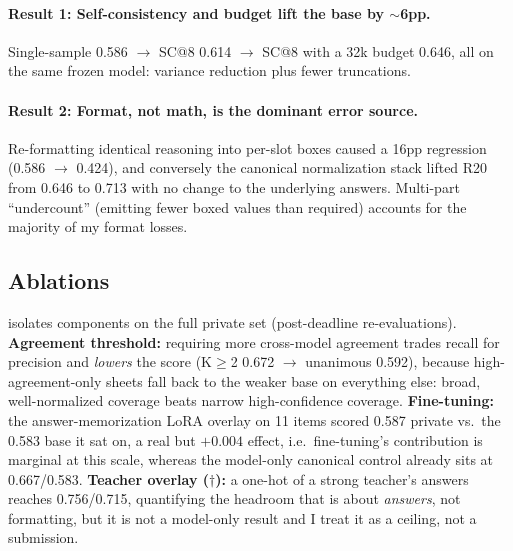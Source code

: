 \documentclass{article}
\begin{document}
\paragraph{Result 1: Self-consistency and budget lift the base by $\sim$6pp.}
Single-sample 0.586 $\to$ SC@8 0.614 $\to$ SC@8 with a 32k budget 0.646, all on the
same frozen model: variance reduction plus fewer truncations.

\paragraph{Result 2: Format, not math, is the dominant error source.}
Re-formatting identical reasoning into per-slot boxes caused a 16pp regression
(0.586 $\to$ 0.424), and conversely the canonical normalization stack lifted R20 from
0.646 to 0.713 with no change to the underlying answers. Multi-part ``undercount''
(emitting fewer boxed values than required) accounts for the majority of my format
losses.

\subsection{Ablations}
\label{sec:ablations}
 isolates components on the full private set (post-deadline
re-evaluations). \textbf{Agreement threshold:} requiring more cross-model agreement
trades recall for precision and \emph{lowers} the score (K$\geq$2 0.672 $\to$
unanimous 0.592), because high-agreement-only sheets fall back to the weaker base on
everything else: broad, well-normalized coverage beats narrow
high-confidence coverage. \textbf{Fine-tuning:} the answer-memorization LoRA overlay
on 11 items scored 0.587 private vs.\ the 0.583 base it sat on, a real but
$+0.004$ effect, i.e.\ fine-tuning's contribution is marginal at this scale, whereas
the model-only canonical control already sits at 0.667/0.583. \textbf{Teacher
overlay ($\dagger$):} a one-hot of a strong teacher's answers reaches 0.756/0.715,
quantifying the headroom that is about \emph{answers}, not formatting, but it is
not a model-only result and I treat it as a ceiling, not a submission.
\end{document}
